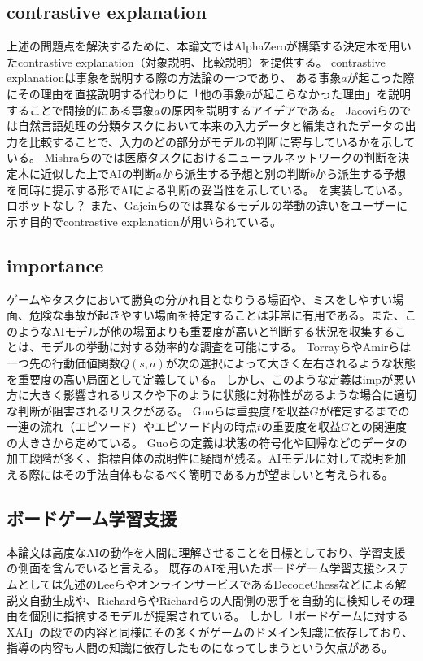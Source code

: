 \subsection{contrastive explanation}
上述の問題点を解決するために、本論文ではAlphaZeroが構築する決定木を用いたcontrastive explanation（対象説明、比較説明）を提供する。
contrastive explanationは事象を説明する際の方法論の一つであり、
ある事象$a$が起こった際にその理由を直接説明する代わりに「他の事象$\bar{a}$が起こらなかった理由」を説明することで間接的にある事象$a$の原因を説明するアイデアである\cite{contrastive}。
Jacoviらの\cite{contrastive}では自然言語処理の分類タスクにおいて本来の入力データと編集されたデータの出力を比較することで、入力のどの部分がモデルの判断に寄与しているかを示している。
Mishraらの\cite{whyNot}では医療タスクにおけるニューラルネットワークの判断を決定木に近似した上でAIの判断$a$から派生する予想と別の判断$b$から派生する予想を同時に提示する形でAIによる判断の妥当性を示している。
を実装している。ロボットなし？
また、Gajcinらの\cite{preference}では異なるモデルの挙動の違いをユーザーに示す目的でcontrastive explanationが用いられている。

\subsection{importance}
ゲームやタスクにおいて勝負の分かれ目となりうる場面や、ミスをしやすい場面、危険な事故が起きやすい場面を特定することは非常に有用である。また、このようなAIモデルが他の場面よりも重要度が高いと判断する状況を収集することは、モデルの挙動に対する効率的な調査を可能にする。
Torrayら\cite{imp2013}やAmirら\cite{imp2016}は一つ先の行動価値関数$Q(s, a)$が次の選択によって大きく左右されるような状態を重要度の高い局面として定義している。
しかし、このような定義はimpが悪い方に大きく影響されるリスクや下のように状態に対称性があるような場合に適切な判断が阻害されるリスクがある。
Guoら\cite{EDGE}は重要度$I$を収益$G$が確定するまでの一連の流れ（エピソード）やエピソード内の時点$t$の重要度を収益$G$との関連度の大きさから定めている。
Guoらの定義は状態の符号化や回帰などのデータの加工段階が多く、指標自体の説明性に疑問が残る。AIモデルに対して説明を加える際にはその手法自体もなるべく簡明である方が望ましいと考えられる。





\subsection{ボードゲーム学習支援}
本論文は高度なAIの動作を人間に理解させることを目標としており、学習支援の側面を含んでいると言える。
既存のAIを用いたボードゲーム学習支援システムとしては先述のLeeら\cite{ChessComments}やオンラインサービスであるDecodeChess\cite{DecodeChess}などによる解説文自動生成や、Richard\cite{badMoves2016}らやRichard\cite{badMoves2017}らの人間側の悪手を自動的に検知しその理由を個別に指摘するモデルが提案されている。
しかし「ボードゲームに対するXAI」の段での内容と同様にその多くがゲームのドメイン知識に依存しており、指導の内容も人間の知識に依存したものになってしまうという欠点がある。



